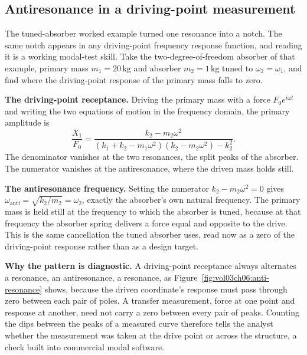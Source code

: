 

\subsection{Antiresonance in a driving-point measurement}

The tuned-absorber worked example turned one resonance into a notch. The
same notch appears in any driving-point frequency response function, and
reading it is a working modal-test skill. Take the two-degree-of-freedom
absorber of that example, primary mass $m_1 = 20\,\si{\kilogram}$ and
absorber $m_2 = 1\,\si{\kilogram}$ tuned to $\omega_2 = \omega_1$, and
find where the driving-point response of the primary mass falls to zero.

\textbf{The driving-point receptance.} Driving the primary mass with a
force $F_0 e^{i\omega t}$ and writing the two equations of motion in the
frequency domain, the primary amplitude is
\[
\frac{X_1}{F_0} = \frac{k_2 - m_2\omega^2}{(k_1 + k_2 - m_1\omega^2)(k_2
- m_2\omega^2) - k_2^2}.
\]
The denominator vanishes at the two resonances, the split peaks of the
absorber. The numerator vanishes at the antiresonance, where the driven
mass holds still.

\textbf{The antiresonance frequency.} Setting the numerator $k_2 -
m_2\omega^2 = 0$ gives $\omega_{\text{anti}} = \sqrt{k_2/m_2} =
\omega_2$, exactly the absorber's own natural frequency. The primary
mass is held still at the frequency to which the absorber is tuned,
because at that frequency the absorber spring delivers a force equal and
opposite to the drive. This is the same cancellation the tuned absorber
uses, read now as a zero of the driving-point response rather than as a
design target.

\textbf{Why the pattern is diagnostic.} A driving-point receptance
always alternates a resonance, an antiresonance, a resonance, as
Figure~\ref{fig:vol03ch06:anti-resonance} shows, because the driven
coordinate's response must pass through zero between each pair of poles.
A transfer measurement, force at one point and response at another, need
not carry a zero between every pair of peaks. Counting the dips between
the peaks of a measured curve therefore tells the analyst whether the
measurement was taken at the drive point or across the structure, a
check built into commercial modal software.



